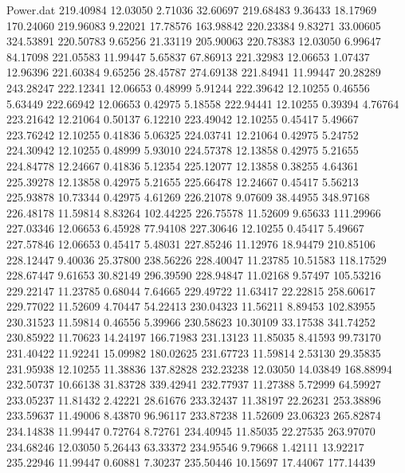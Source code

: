 \begin{filecontents}{Power.dat}
 219.40984   12.03050    2.71036   32.60697
 219.68483    9.36433   18.17969  170.24060
 219.96083    9.22021   17.78576  163.98842
 220.23384    9.83271   33.00605  324.53891
 220.50783    9.65256   21.33119  205.90063
 220.78383   12.03050    6.99647   84.17098
 221.05583   11.99447    5.65837   67.86913
 221.32983   12.06653    1.07437   12.96396
 221.60384    9.65256   28.45787  274.69138
 221.84941   11.99447   20.28289  243.28247
 222.12341   12.06653    0.48999    5.91244
 222.39642   12.10255    0.46556    5.63449
 222.66942   12.06653    0.42975    5.18558
 222.94441   12.10255    0.39394    4.76764
 223.21642   12.21064    0.50137    6.12210
 223.49042   12.10255    0.45417    5.49667
 223.76242   12.10255    0.41836    5.06325
 224.03741   12.21064    0.42975    5.24752
 224.30942   12.10255    0.48999    5.93010
 224.57378   12.13858    0.42975    5.21655
 224.84778   12.24667    0.41836    5.12354
 225.12077   12.13858    0.38255    4.64361
 225.39278   12.13858    0.42975    5.21655
 225.66478   12.24667    0.45417    5.56213
 225.93878   10.73344    0.42975    4.61269
 226.21078    9.07609   38.44955  348.97168
 226.48178   11.59814    8.83264  102.44225
 226.75578   11.52609    9.65633  111.29966
 227.03346   12.06653    6.45928   77.94108
 227.30646   12.10255    0.45417    5.49667
 227.57846   12.06653    0.45417    5.48031
 227.85246   11.12976   18.94479  210.85106
 228.12447    9.40036   25.37800  238.56226
 228.40047   11.23785   10.51583  118.17529
 228.67447    9.61653   30.82149  296.39590
 228.94847   11.02168    9.57497  105.53216
 229.22147   11.23785    0.68044    7.64665
 229.49722   11.63417   22.22815  258.60617
 229.77022   11.52609    4.70447   54.22413
 230.04323   11.56211    8.89453  102.83955
 230.31523   11.59814    0.46556    5.39966
 230.58623   10.30109   33.17538  341.74252
 230.85922   11.70623   14.24197  166.71983
 231.13123   11.85035    8.41593   99.73170
 231.40422   11.92241   15.09982  180.02625
 231.67723   11.59814    2.53130   29.35835
 231.95938   12.10255   11.38836  137.82828
 232.23238   12.03050   14.03849  168.88994
 232.50737   10.66138   31.83728  339.42941
 232.77937   11.27388    5.72999   64.59927
 233.05237   11.81432    2.42221   28.61676
 233.32437   11.38197   22.26231  253.38896
 233.59637   11.49006    8.43870   96.96117
 233.87238   11.52609   23.06323  265.82874
 234.14838   11.99447    0.72764    8.72761
 234.40945   11.85035   22.27535  263.97070
 234.68246   12.03050    5.26443   63.33372
 234.95546    9.79668    1.42111   13.92217
 235.22946   11.99447    0.60881    7.30237
 235.50446   10.15697   17.44067  177.14439

\end{filecontents}
